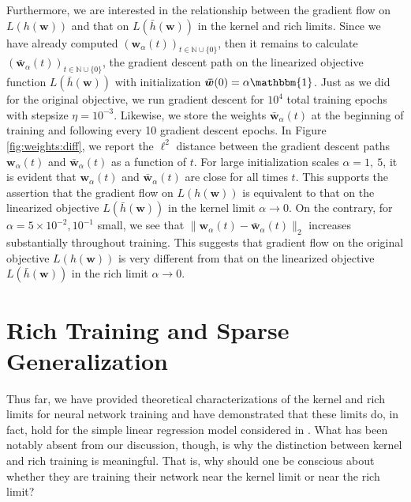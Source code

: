\documentclass{article}
\begin{document}
Furthermore, we are interested in the relationship between the gradient flow on $L(h(\boldsymbol{w}))$ and that on $L(\bar{h}(\boldsymbol{w}))$ in the kernel and rich limits. Since we have already computed $(\boldsymbol{w}_{\alpha}(t))_{t \in \mathbb{N} \cup \{0\}}$, then it remains to calculate $(\boldsymbol{\bar{w}}_{\alpha}(t))_{t \in \mathbb{N} \cup \{0\}}$, the gradient descent path on the linearized objective function $L(\bar{h}(\boldsymbol{w}))$ with initialization $\boldsymbol{\bar{w}}(0) = \alpha \mathbbm{1}$. Just as we did for the original objective, we run gradient descent for $10^4$ total training epochs with stepsize $\eta = 10^{-3}$. Likewise, we store the weights $\boldsymbol{\bar{w}}_{\alpha}(t)$ at the beginning of training and following every 10 gradient descent epochs. In Figure \ref{fig:weights:diff}, we report the $\ell^2$ distance between the gradient descent paths $\boldsymbol{w}_{\alpha}(t)$ and $\boldsymbol{\bar{w}}_{\alpha}(t)$ as a function of $t$. For large initialization scales $\alpha = 1, \ 5$, it is evident that $\boldsymbol{w}_{\alpha}(t)$ and $\boldsymbol{\bar{w}}_{\alpha}(t)$ are close for all times $t$. This supports the assertion that the gradient flow on $L(h(\boldsymbol{w}))$ is equivalent to that on the linearized objective $L(\bar{h}(\boldsymbol{w}))$ in the kernel limit $\alpha \rightarrow 0$. On the contrary, for $\alpha = 5 \times 10^{-2}, 10^{-1}$ small, we see that $\| \boldsymbol{w}_{\alpha}(t) - \boldsymbol{\bar{w}}_{\alpha}(t) \|_2$ increases substantially throughout training. This suggests that gradient flow on the original objective $L(h(\boldsymbol{w}))$ is very different from that on the linearized objective $L(\bar{h}(\boldsymbol{w}))$ in the rich limit $\alpha \rightarrow 0$.

\section{Rich Training and Sparse Generalization}\label{richgeneralization}

Thus far, we have provided theoretical characterizations of the kernel and rich limits for neural network training and have demonstrated that these limits do, in fact, hold for the simple linear regression model considered in \cite{woodworth2020kernel}. What has been notably absent from our discussion, though, is why the distinction between kernel and rich training is meaningful. That is, why should one be conscious about whether they are training their network near the kernel limit or near the rich limit? 
\end{document}
